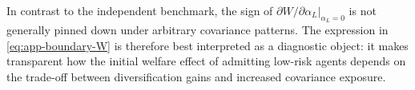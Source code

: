 \documentclass[a4paper,12pt]{article}
\theoremstyle{definition}
\theoremstyle{remark}
\newcommand{\1}{\mathbf{1}}
\begin{document}
In contrast to the independent benchmark, the sign of
\(\partial W/\partial\alpha_L\vert_{\alpha_L=0}\) is not generally pinned down
under arbitrary covariance patterns. The expression in
\eqref{eq:app-boundary-W} is therefore best interpreted as a diagnostic object:
it makes transparent how the initial welfare effect of admitting low-risk
agents depends on the trade-off between diversification gains and increased
covariance exposure.



\newpage


\end{document}
